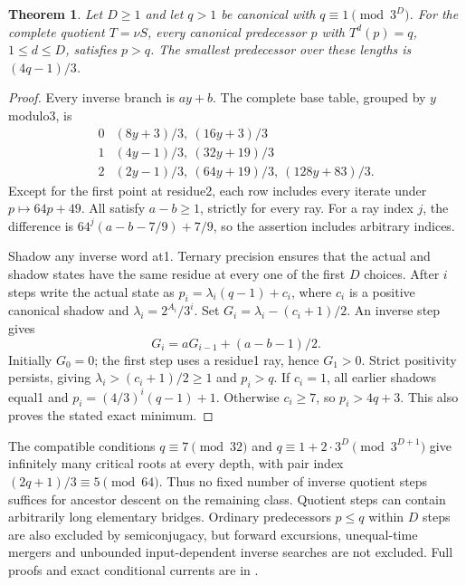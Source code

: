 \documentclass[11pt]{article}
\newtheorem{theorem}{Theorem}
\begin{document}
\begin{theorem}\label{thm:completeinversebarrier}
Let $D\ge1$ and let $q>1$ be canonical with $q\equiv1\pmod{3^D}$.
For the complete quotient $T=\nu S$, every canonical predecessor $p$
with $T^d(p)=q$, $1\le d\le D$, satisfies $p>q$.
The smallest predecessor over these lengths is $(4q-1)/3$.
\end{theorem}
\begin{proof}
Every inverse branch is $ay+b$. The complete base table, grouped by
$y$ modulo3, is
\[
\begin{array}{c|c}
0&(8y+3)/3,\ (16y+3)/3\\
1&(4y-1)/3,\ (32y+19)/3\\
2&(2y-1)/3,\ (64y+19)/3,\ (128y+83)/3.
\end{array}
\]
Except for the first point at residue2, each row includes every iterate
under $p\mapsto64p+49$. All satisfy $a-b\ge1$, strictly for every ray.
For a ray index $j$, the difference is
$64^j(a-b-7/9)+7/9$, so the assertion includes arbitrary indices.

Shadow any inverse word at1. Ternary precision ensures that the actual
and shadow states have the same residue at every one of the first $D$
choices. After $i$ steps write the actual state as
$p_i=\lambda_i(q-1)+c_i$, where $c_i$ is a positive canonical shadow
and $\lambda_i=2^{A_i}/3^i$. Set $G_i=\lambda_i-(c_i+1)/2$.
An inverse step gives
\[
 G_i=aG_{i-1}+(a-b-1)/2.
\]
Initially $G_0=0$; the first step uses a residue1 ray, hence $G_1>0$.
Strict positivity persists, giving $\lambda_i>(c_i+1)/2\ge1$ and $p_i>q$.
If $c_i=1$, all earlier shadows equal1 and
$p_i=(4/3)^i(q-1)+1$. Otherwise $c_i\ge7$, so $p_i>4q+3$.
This also proves the stated exact minimum.
\end{proof}

The compatible conditions $q\equiv7\pmod{32}$ and
$q\equiv1+2\cdot3^D\pmod{3^{D+1}}$ give infinitely many critical roots
at every depth, with pair index $(2q+1)/3\equiv5\pmod{64}$.
Thus no fixed number of inverse quotient steps suffices for ancestor
descent on the remaining class. Quotient steps can contain arbitrarily
long elementary bridges. Ordinary predecessors $p\le q$ within $D$ steps are also excluded by
semiconjugacy, but forward excursions, unequal-time mergers and unbounded
input-dependent inverse searches are not excluded. Full proofs and exact
conditional currents are in
.
\end{document}
